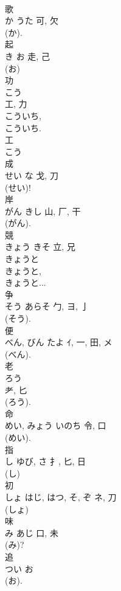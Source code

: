 \documentclass[8pt]{extreport}
\begin{document}
\begin{CJK}{UTF8}{min}
\\	歌	
\\	か	うた	可, 欠	
\\	(か).	
\\	起	
\\	き	お	走, 己	
\\	(お) 
\\	功	
\\	こう	
\\	工, 力	
\\	こういち, 
\\	こういち. 
\\	工 
\\	こう 
\\	成	
\\	せい	な	戈, 刀	
\\	(せい)! 
\\	岸	
\\	がん	きし	山, 厂, 干	
\\	(がん). 
\\	競	
\\	きょう	きそ	立, 兄	
\\	きょうと 
\\	きょうと, 
\\	きょうと... 
\\	争	
\\	そう	あらそ	勹, ヨ, 亅	
\\	(そう). 
\\	便	
\\	べん, びん	たよ	ｲ, 一, 田, メ	
\\	(べん). 
\\	老	
\\	ろう	
\\	耂, 匕	
\\	(ろう). 
\\	命	
\\	めい, みょう	いのち	令, 口	
\\	(めい). 
\\	指	
\\	し	ゆび, さ	扌, 匕, 日	
\\	(し) 
\\	初	
\\	しょ	はじ, はつ, そ, ぞ	ネ, 刀	
\\	(しょ) 
\\	味	
\\	み	あじ	口, 未	
\\	(み)? 
\\	追	
\\	つい	お		
\\	(お). 

\end{CJK}
\end{document}
